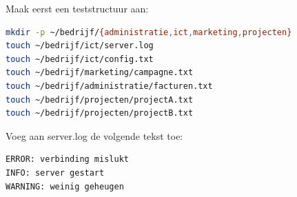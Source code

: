 Maak eerst een teststructuur aan:

\begin{lstlisting}[language=bash]
mkdir -p ~/bedrijf/{administratie,ict,marketing,projecten}
touch ~/bedrijf/ict/server.log
touch ~/bedrijf/ict/config.txt
touch ~/bedrijf/marketing/campagne.txt
touch ~/bedrijf/administratie/facturen.txt
touch ~/bedrijf/projecten/projectA.txt
touch ~/bedrijf/projecten/projectB.txt
\end{lstlisting}

Voeg aan server.log de volgende tekst toe:
\begin{lstlisting}
ERROR: verbinding mislukt
INFO: server gestart
WARNING: weinig geheugen
\end{lstlisting}

